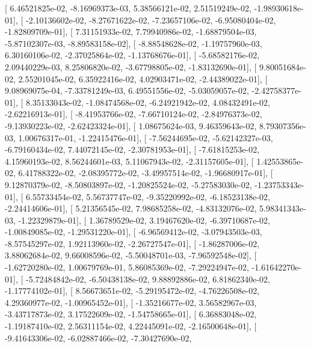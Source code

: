 \documentclass{article}
\begin{document}
       [  6.46521825e-02,  -8.16969373e-03,   5.38566121e-02,
          2.51519249e-02,  -1.98930618e-01],
       [ -2.10136602e-02,  -8.27671622e-02,  -7.23657106e-02,
         -6.95080404e-02,  -1.82809709e-01],
       [  7.31151933e-02,   7.79940986e-02,  -1.68879504e-03,
         -5.87102307e-03,  -8.89583158e-02],
       [ -8.88548628e-02,  -1.19757960e-03,   6.30160106e-02,
         -2.37025864e-02,  -1.13768676e-01],
       [ -5.68582176e-02,   2.09440229e-03,   8.25806820e-02,
         -3.67798805e-02,  -1.83132690e-01],
       [  9.80051684e-02,   2.55201045e-02,   6.35922416e-02,
          4.02903471e-02,  -2.44389022e-01],
       [  9.08969075e-04,  -7.33781249e-03,   6.49551556e-02,
         -5.03059057e-02,  -2.42758377e-01],
       [  8.35133043e-02,  -1.08474568e-02,  -6.24921942e-02,
          4.08432491e-02,  -2.62216913e-01],
       [ -8.41953766e-02,  -7.66710124e-02,  -2.84976373e-02,
         -9.13930223e-02,  -2.62423324e-01],
       [  1.08675624e-03,   9.46359643e-02,   8.79307356e-03,
          1.00676317e-01,  -1.22415476e-01],
       [ -7.56244695e-02,  -5.62142327e-03,  -6.79160434e-02,
          7.44072145e-02,  -2.30781953e-01],
       [ -7.61815253e-02,   4.15960193e-02,   8.56244601e-03,
          5.11067943e-02,  -2.31157605e-01],
       [  1.42553865e-02,   6.41788322e-02,  -2.08395772e-02,
         -3.49957514e-02,  -1.96680917e-01],
       [  9.12870379e-02,  -8.50803897e-02,  -1.20825524e-02,
         -5.27583030e-02,  -1.23753343e-01],
       [  6.55733454e-02,   5.56737747e-02,  -9.35220992e-02,
         -6.18523138e-02,  -2.24414606e-01],
       [  5.21356545e-02,   7.98685258e-02,  -4.83132076e-02,
          5.98341343e-03,  -1.22329879e-01],
       [  1.36789529e-02,   3.19467620e-02,  -6.39710687e-02,
         -1.00849085e-02,  -1.29531220e-01],
       [ -6.96569412e-02,  -3.07943503e-03,  -8.57545297e-02,
          1.92113960e-02,  -2.26727547e-01],
       [ -1.86287006e-02,   3.88062684e-02,   9.66008596e-02,
         -5.50048701e-03,  -7.96592548e-02],
       [ -1.62720280e-02,   1.00679769e-01,   5.86085369e-02,
         -7.29224947e-02,  -1.61642270e-01],
       [ -5.72484842e-02,  -6.50438138e-02,   9.88892886e-02,
          6.81862340e-02,  -1.17774102e-01],
       [  8.56673651e-02,  -5.29195472e-02,  -4.76226508e-02,
          4.29360977e-02,  -1.00965452e-01],
       [ -1.35216677e-02,   3.56582967e-03,  -3.43717873e-02,
          3.17522609e-02,  -1.54758665e-01],
       [  6.36883048e-02,  -1.19187410e-02,   2.56311154e-02,
          4.22445091e-02,  -2.16500648e-01],
       [ -9.41643306e-02,  -6.02887466e-02,  -7.30427690e-02,
\end{document}
